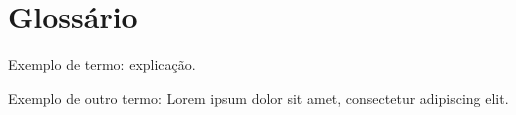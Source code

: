 \chapter*{Glossário}
\noindent Exemplo de termo: explicação.

\noindent Exemplo de outro termo: Lorem ipsum dolor sit amet, consectetur adipiscing elit.